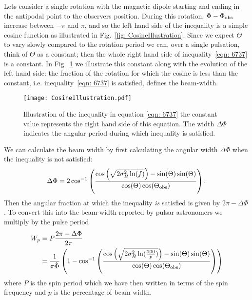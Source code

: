 \documentclass[../full_thesis/full_thesis.tex]{subfiles}
\begin{document}
Lets consider a single rotation with the magnetic dipole starting and ending in
the antipodal point to the observers position. During this rotation, $\Phi -
\Phi_{\mathrm{obs}}$ increase between $-\pi$ and $\pi$, and so the left hand side of the
inequality is a simple cosine function as illustrated in Fig.~\ref{fig:
CosineIllustration}.  Since we expect $\Theta$ to vary slowly compared to the
rotation period we can, over a single pulsation, think of $\Theta$ as a
constant; then the whole right hand side of inequality~\eqref{eqn: 6737} is a
constant. In Fig.~\ref{fig: CosineIllustration} we illustrate this constant
along with the evolution of the left hand side: the fraction of the rotation
for which the cosine is less than the constant, i.e. inequality~\eqref{eqn: 6737}
is satisfied, defines the beam-width.
\begin{figure}[ht]
\centering
\texttt{[image: CosineIllustration.pdf]}
\caption{Illustration of the inequality in equation \eqref{eqn: 6737} the constant
         value represents the right hand side of this equation. The
         width $\Delta\Phi$ indicates the angular period during which inequality
         is satisfied.}
\label{fig: CosineIllustration}
\end{figure}

We can calculate the beam width by first calculating the angular width $\Delta\Phi$
when the inequality is not satisfied:
\begin{equation}
    \Delta\Phi = 2\cos^{-1}\left(
                \frac{\cos\left(\sqrt{2\sigma_{B}^{2} \ln(f)}\right) - \sin(\Theta)\sin(\Theta)}
                          {\cos(\Theta)\cos(\Theta_{\mathrm{obs}})}
                      \right).
\end{equation}
Then the angular fraction at which the inequality \emph{is} satisfied is given by
$2\pi - \Delta\Phi$. To convert this into the beam-width reported by pulsar
astronomers we multiply by the pulse period
\begin{align}
    W_{p} & = P \frac{2\pi - \Delta\Phi}{2\pi}\\
          & = \frac{1}{\pi \dot{\Phi}}\left(1 -
               \cos^{-1}\left(
                   \frac{\cos\left(\sqrt{2\sigma_{B}^{2} \ln(\frac{100}{p})}\right) - \sin(\Theta)\sin(\Theta)}
                          {\cos(\Theta)\cos(\Theta_{\mathrm{obs}})}
                      \right)
                  \right)
\label{eqn: Wp}
\end{align}
where $P$ is the spin period which we have then written in terms of the spin
frequency and $p$ is the percentage of beam width.
\end{document}
